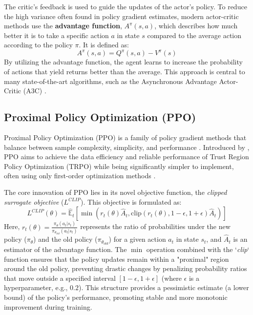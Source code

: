 The critic's feedback is used to guide the updates of the actor's policy. To reduce the high variance often found in policy gradient estimates, modern actor-critic methods use the \textbf{advantage function}, $A^\pi(s, a)$, which describes how much better it is to take a specific action $a$ in state $s$ compared to the average action according to the policy $\pi$. It is defined as:
\begin{equation}
    A^\pi(s, a) = Q^\pi(s, a) - V^\pi(s)
\end{equation}
By utilizing the advantage function, the agent learns to increase the probability of actions that yield returns better than the average. This approach is central to many state-of-the-art algorithms, such as the Asynchronous Advantage Actor-Critic (A3C) \cite{mnih2016asynchronous}.


\subsection{Proximal Policy Optimization (PPO)}
Proximal Policy Optimization (PPO) is a family of policy gradient methods that balance between sample complexity, simplicity, and performance \cite{Schulman2017ProximalPO}. Introduced by \cite{Schulman2017ProximalPO}, PPO aims to achieve the data efficiency and reliable performance of Trust Region Policy Optimization (TRPO) while being significantly simpler to implement, often using only first-order optimization methods \cite{Schulman2017ProximalPO}.

The core innovation of PPO lies in its novel objective function, the \textit{clipped surrogate objective} ($L^{CLIP}$). This objective is formulated as:
$$ L^{CLIP}(\theta) = \hat{\mathbb{E}}_{t}[\min(r_t(\theta)\hat{A}_t, \text{clip}(r_t(\theta), 1-\epsilon, 1+\epsilon)\hat{A}_t)] $$
Here, $r_t(\theta) = \frac{\pi_{\theta}(a_t|s_t)}{\pi_{\theta_{old}}(a_t|s_t)}$ represents the ratio of probabilities under the new policy ($\pi_{\theta}$) and the old policy ($\pi_{\theta_{old}}$) for a given action $a_t$ in state $s_t$, and $\hat{A}_t$ is an estimator of the advantage function. The \textit{$\min$} operation combined with the `\textit{clip}` function ensures that the policy updates remain within a "proximal" region around the old policy, preventing drastic changes by penalizing probability ratios that move outside a specified interval $[1-\epsilon, 1+\epsilon]$ (where $\epsilon$ is a hyperparameter, e.g., $0.2$). This structure provides a pessimistic estimate (a lower bound) of the policy's performance, promoting stable and more monotonic improvement during training.

